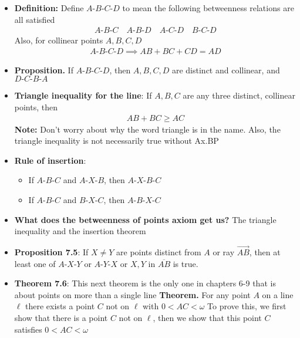 \documentclass{report}
\begin{document}
\begin{itemize}
    \item \textbf{Definition:} Define $A\text{-}B\text{-}C\text{-}D$ to mean the following betweenness relations are all satisfied
        \begin{align*}
            A\text{-}B\text{-}C \quad A\text{-}B\text{-}D \quad A\text{-}C\text{-}D \quad B\text{-}C\text{-}D 
        \end{align*}
        \bigbreak \noindent 
        Also, for collinear points $A,B,C,D$
        \begin{align*}
            A\text{-}B\text{-}C\text{-}D \implies AB + BC + CD = AD
        \end{align*}
    \item \textbf{Proposition.} If $A\text{-}B\text{-}C\text{-}D$, then $A,B,C,D$ are distinct and collinear, and $D\text{-}C\text{-}B\text{-}A $
        \bigbreak \noindent 

    \item \textbf{Triangle inequality for the line}: If $A,B,C$ are any three distinct, collinear points, then 
        \begin{align*}
            AB + BC \geq AC 
        \end{align*}
        \bigbreak \noindent 
        \textbf{Note:} Don't worry about why the word triangle is in the name. Also, the triangle inequality is not necessarily true without Ax.BP
        \bigbreak \noindent 

    \item \textbf{Rule of insertion}: 
        \begin{itemize}
            \item If $ A\text{-}B\text{-}C$ and $ A\text{-}X\text{-}B$, then $ A\text{-}X\text{-}B\text{-}C $
            \item If $ A\text{-}B\text{-}C$ and $ B\text{-}X\text{-}C$, then $ A\text{-}B\text{-}X\text{-}C $
        \end{itemize}

    \item \textbf{What does the betweenness of points axiom get us?} The triangle inequality and the insertion theorem 

    \item \textbf{Proposition 7.5}: If $X \ne Y$ are points distinct from $A$ or ray $\overrightarrow{AB}$, then at least one of $ A\text{-}X\text{-}Y$ or $ A\text{-}Y\text{-}X$ or $X,Y$ in $ \overline{AB}$ is true.
    \item \textbf{Theorem 7.6}: This next theorem is the only one in chapters 6-9 that is about points on more than a single line
        \bigbreak \noindent 
        \textbf{Theorem.} For any point $A$ on a line $\ell$ there exists a point $C$ not on $\ell$ with $0 < AC <\omega$ 
        \bigbreak \noindent 
        To prove this, we first show that there is a point $C$ not on $\ell$, then we show that this point $C$ satisfies $0 < AC < \omega$


\end{itemize}
\end{document}
